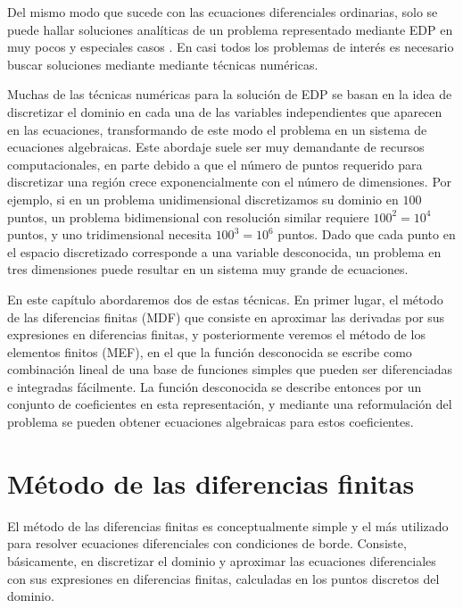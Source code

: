 Del mismo modo que sucede con las ecuaciones diferenciales ordinarias, solo se puede hallar soluciones analíticas de un problema representado mediante EDP en muy pocos y especiales casos \cite{tijonov1983}. En casi todos los problemas de interés es necesario buscar soluciones mediante mediante técnicas numéricas. 

Muchas de las técnicas numéricas para la solución de EDP se basan en la idea de discretizar el dominio en cada una de las variables independientes que aparecen en las ecuaciones, transformando de este modo el problema en un sistema de ecuaciones algebraicas. Este abordaje suele ser muy demandante de recursos computacionales, en parte debido a que el número de puntos requerido para discretizar una región crece exponencialmente con el número de dimensiones. Por ejemplo, si en un problema unidimensional discretizamos su dominio en $100$ puntos, un problema bidimensional con resolución similar requiere $100^2 = 10^4$ puntos, y uno tridimensional necesita $100^3 = 10^6$ puntos. Dado que cada punto en el espacio discretizado corresponde a una variable desconocida, un problema en tres dimensiones puede resultar en un sistema muy grande de ecuaciones.

En este capítulo abordaremos dos de estas técnicas. En primer lugar, el método de las diferencias finitas (MDF) que consiste en aproximar las derivadas por sus expresiones en diferencias finitas, y posteriormente veremos el método de los elementos finitos (MEF), en el que la función desconocida se escribe como combinación lineal de una base de funciones simples que pueden ser diferenciadas e integradas fácilmente. La función desconocida se describe entonces por un conjunto de coeficientes en esta representación, y mediante una reformulación
del problema se pueden obtener ecuaciones algebraicas para estos coeficientes.
 

\section{Método de las diferencias finitas}
El método de las diferencias finitas es conceptualmente simple y el más utilizado para resolver ecuaciones diferenciales con condiciones de borde. Consiste, básicamente, en discretizar el dominio y aproximar las ecuaciones diferenciales con sus expresiones en diferencias finitas, calculadas en los puntos discretos del dominio.

